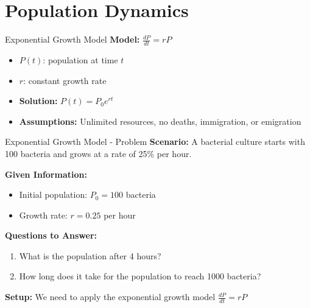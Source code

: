 \documentclass[10pt,aspectratio=169]{beamer}
\begin{document}
\section{Population Dynamics}
\begin{frame}{Exponential Growth Model}
    \textbf{Model:} $\frac{dP}{dt} = rP$
    \begin{itemize}
        \item $P(t)$: population at time $t$
        \item $r$: constant growth rate
        \item \textbf{Solution:} $P(t) = P_0 e^{rt}$
        \item \textbf{Assumptions:} Unlimited resources, no deaths, immigration, or emigration
    \end{itemize}
\end{frame}

\begin{frame}{Exponential Growth Model - Problem}
    \textbf{Scenario:} A bacterial culture starts with 100 bacteria and grows at a rate of 25\% per hour.
    
    \textbf{Given Information:}
    \begin{itemize}
        \item Initial population: $P_0 = 100$ bacteria
        \item Growth rate: $r = 0.25$ per hour
    \end{itemize}
    
    \textbf{Questions to Answer:}
    \begin{enumerate}
        \item What is the population after 4 hours?
        \item How long does it take for the population to reach 1000 bacteria?
    \end{enumerate}
    
    \textbf{Setup:} We need to apply the exponential growth model $\frac{dP}{dt} = rP$
\end{frame}
\end{document}
